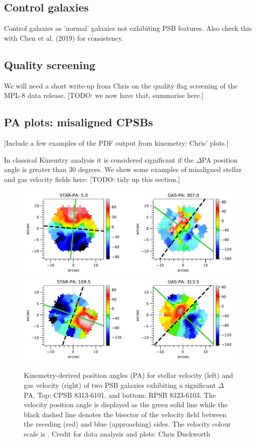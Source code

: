\subsection{Control galaxies}
Control galaxies as 'normal' galaxies not exhibiting PSB features. Also check this with Chen et al. (2019) for consistency.

\subsection{Quality screening}
We will need a short write-up from Chris on the quality flag screening of the MPL-8 data release. [TODO: we now have that, summarise here.]

\subsection{PA plots: misaligned CPSBs}
[Include a few examples of the PDF output from kinemetry: Chris' plots.]

In classical Kinemtry analysis it is considered significant if the $\Delta$PA position angle is greater than 30 degrees. We show some examples of misaligned stellar and gas velocity fields here: 
[TODO: tidy up this section.]

\begin{figure}
    \centering
    \includegraphics[width=\columnwidth]{images/PAplots/PAplotsCPSB/8313-6101-PA.pdf}
    \includegraphics[width=\columnwidth]{images/PAplots/PAplotsRPSB/8323-6103-PA.pdf}
    \caption{Kinemetry-derived position angles (PA) for stellar velocity (left) and gas velocity (right) of two PSB galaxies exhibiting a significant $\Delta$PA. Top: CPSB 8313-6101, and bottom: RPSB 8323-6103. The velocity position angle is displayed as the green solid line while the black dashed line denotes the bisector of the velocity field between the receding (red) and blue (approaching) sides. The velocity colour scale is \kms. Credit for data analysis and plots: Chris Duckworth}
    \label{fig:CPSB-8313-6101-PA}
\end{figure}

